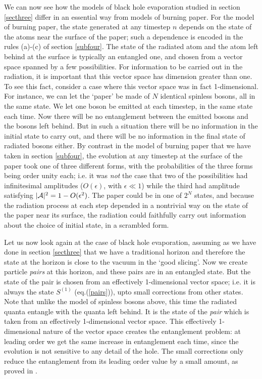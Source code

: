 \documentclass[11pt]{article}
\begin{document}
We can now see how the models of black hole evaporation studied in section \ref{secthree} differ in an essential way from models of burning paper. For the model of burning paper, the state generated at any timestep $n$ depends on the state of the atoms near the surface of the paper; such a dependence is encoded in the rules (a)-(c) of section \ref{subfour}. The state of the radiated atom and the atom left behind at the surface is typically an entangled one, and chosen  from  a vector space spanned by a few possibilities. For information to be carried out in the radiation, it is important that this vector space has dimension greater than one. To see this fact, consider a case where this vector space was in fact 1-dimensional. For instance, we can let the `paper' be made of $N$ identical spinless bosons, all in the same state.  We let one boson be emitted at each timestep, in the same state each time. Now there will be no entanglement between the emitted bosons and the bosons left behind. But in such a situation there will be no information in the initial state to carry out, and there will be no information in the final state of radiated bosons either. By contrast in the model of burning paper that we have taken in section \ref{subfour}, the evolution at any timestep at the surface of the paper took one of three different forms, with the probabilities of the three forms being order unity each; i.e. it was {\it not} the case that two of the possibilities had infinitesimal amplitudes ($O(\epsilon)$, with $\epsilon\ll 1$) while the third had amplitude satisfying $|{\cal A}|^2=1-O(\epsilon^2)$. The paper could be in one of $2^N$ states, and because the radiation process at each step depended in a nontrivial way on the state of the paper near its surface, the radiation could faithfully carry out information about the choice of initial state, in a scrambled form.





Let us now look again at the case of black hole evaporation, assuming as we have done in section \ref{secthree} that we have a traditional horizon and therefore the state at the horizon is close to the vacuum in the `good slicing'. Now we create particle {\it pairs} at this horizon, and these pairs are in an entangled state. But the state of the pair is chosen from an effectively 1-dimensional vector space; i.e. it is always the state $S^{(1)}$ (eq.(\ref{pairs})), upto small corrections from other states. Note that unlike the model of spinless bosons above, this time the radiated quanta entangle with the quanta left behind. It is the state of the {\it pair} which is taken from an effectively 1-dimensional vector space. This effectively  1-dimensional nature of the vector space  creates the entanglement problem: at leading order we get the same increase in entanglement each time, since the evolution is not sensitive to any detail of the hole. The small corrections only reduce the entanglement from its leading order value by a small amount, as proved in \cite{mathurfuzz}. 
\end{document}
